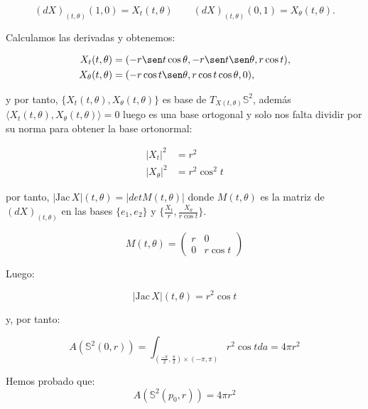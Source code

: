 \begin{remark}
\begin{equation*}
    (dX)_{(t, \theta)}(1,0) = X_t(t, \theta) \qquad (dX)_{(t, \theta)}(0,1) = X_\theta(t, \theta).
\end{equation*}

Calculamos las derivadas y obtenemos:

\begin{align*}
    X_t(t, \theta) &= (-r\sen t\cos\theta, -r\sen t\sen\theta, r\cos t), \\
    X_\theta(t, \theta) &= (-r\cos t\sen\theta, r\cos t\cos\theta, 0),
\end{align*}

y por tanto, $\{ X_t(t, \theta), X_\theta(t, \theta) \}$ es base de $T_{X(t,\theta)} \mathbb{S}^2$, además $\langle X_t(t, \theta), X_\theta(t, \theta) \rangle = 0$ luego es una base ortogonal y solo nos falta dividir por su norma para obtener la base ortonormal:

\begin{align*}
    |X_t|^2 &= r^2 \\
    |X_\theta|^2 &= r^2\cos^2t
\end{align*}

por tanto, $|\text{Jac} \, X|(t,\theta) = |det M(t,\theta)|$  donde $M(t,\theta)$ es la matriz de $(dX)_{(t, \theta)}$ en las bases $\{e_1, e_2\}$ y $\{ \frac{X_t}{r}, \frac{X_\theta}{r\cos t} \}$.

\begin{equation*}
    M(t,\theta) = \left( {\begin{array}{cc}
        r & 0 \\
        0 & r\cos t
    \end{array} } \right)
\end{equation*}

Luego:

\begin{equation*}
    |\text{Jac} \, X|(t,\theta) = r^2\cos t
\end{equation*}

y, por tanto:

\begin{equation*}
    A(\mathbb{S}^2(0,r)) = \int_{(\frac{-\pi}{2}, \frac{\pi}{2}) \times (-\pi, \pi)} r^2\cos t da = 4\pi r^2 
\end{equation*}

Hemos probado que:
\begin{equation*}
    A(\mathbb{S}^2(p_0,r)) = 4\pi r^2 
\end{equation*}
\end{remark}

